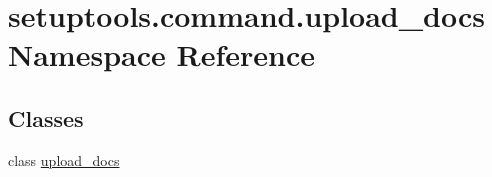 \hypertarget{namespacesetuptools_1_1command_1_1upload__docs}{}\section{setuptools.\+command.\+upload\+\_\+docs Namespace Reference}
\label{namespacesetuptools_1_1command_1_1upload__docs}
\subsection*{Classes}
\begin{DoxyCompactItemize}
\item 
class \hyperlink{classsetuptools_1_1command_1_1upload__docs_1_1upload__docs}{upload\+\_\+docs}
\end{DoxyCompactItemize}
